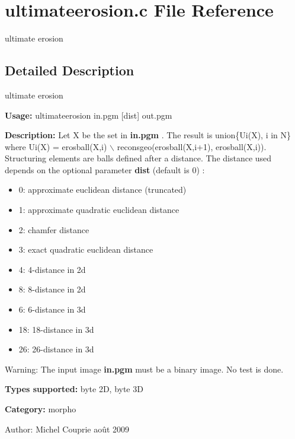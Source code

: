 \section{ultimateerosion.c File Reference}
\label{ultimateerosion_8c}
ultimate erosion  




\label{_details}
\subsection{Detailed Description}
ultimate erosion 

{\bf Usage:} ultimateerosion in.pgm [dist] out.pgm

{\bf Description:} Let X be the set in {\bf in.pgm} . The result is union\{Ui(X), i in N\} where Ui(X) = erosball(X,i) $\backslash$ reconsgeo(erosball(X,i+1), erosball(X,i)). Structuring elements are balls defined after a distance. The distance used depends on the optional parameter {\bf dist} (default is 0) : \begin{itemize}
\item 0: approximate euclidean distance (truncated) \item 1: approximate quadratic euclidean distance \item 2: chamfer distance \item 3: exact quadratic euclidean distance \item 4: 4-distance in 2d \item 8: 8-distance in 2d \item 6: 6-distance in 3d \item 18: 18-distance in 3d \item 26: 26-distance in 3d\end{itemize}
\begin{Desc}
\item[Warning:]The input image {\bf in.pgm} must be a binary image. No test is done.\end{Desc}
{\bf Types supported:} byte 2D, byte 3D

{\bf Category:} morpho

\begin{Desc}
\item[Author:]Michel Couprie août 2009 \end{Desc}
